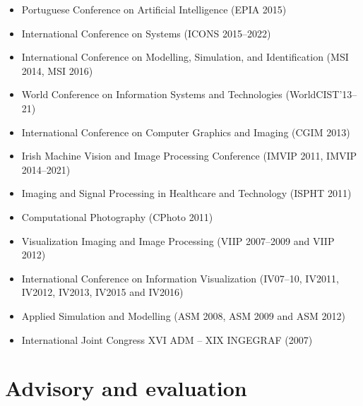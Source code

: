 \documentclass[11pt]{article}
\begin{document}
\begin{itemize}
  \item Portuguese Conference on Artificial Intelligence (EPIA 2015)
  \item International Conference on Systems (ICONS 2015--2022)
  \item International Conference on Modelling, Simulation, and Identification (MSI 2014, MSI 2016)
  \item World Conference on Information Systems and Technologies (WorldCIST'13--21)
  \item International Conference on Computer Graphics and Imaging (CGIM 2013)
  \item Irish Machine Vision and Image Processing Conference (IMVIP 2011, IMVIP 2014--2021)
  \item Imaging and Signal Processing in Healthcare and Technology (ISPHT 2011)
  \item Computational Photography (CPhoto 2011)
  \item Visualization Imaging and Image Processing (VIIP 2007--2009 and VIIP 2012) 
  \item International Conference on Information Visualization (IV07--10, IV2011, IV2012, IV2013, IV2015 and IV2016)
  \item Applied Simulation and Modelling (ASM 2008, ASM 2009 and ASM 2012)
  \item International Joint Congress XVI ADM -- XIX INGEGRAF (2007)
\end{itemize}

\section*{Advisory and evaluation}
\end{document}
